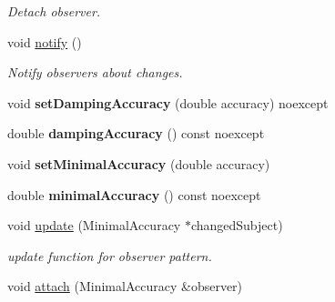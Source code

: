 \begin{DoxyCompactItemize}
\begin{DoxyCompactList}\small\item\em Detach observer. \end{DoxyCompactList}\item 
\hypertarget{classSpacy_1_1Mixin_1_1MixinConnection_a1ddeaa78a3bb4a38c2cca36d1f99fe36}{}void \hyperlink{classSpacy_1_1Mixin_1_1MixinConnection_a1ddeaa78a3bb4a38c2cca36d1f99fe36}{notify} ()\label{classSpacy_1_1Mixin_1_1MixinConnection_a1ddeaa78a3bb4a38c2cca36d1f99fe36}

\begin{DoxyCompactList}\small\item\em Notify observers about changes. \end{DoxyCompactList}\item 
\hypertarget{classSpacy_1_1Mixin_1_1DampingAccuracy_af934aaf17595b7029d9a8ecec2561599}{}void {\bfseries set\+Damping\+Accuracy} (double accuracy) noexcept\label{classSpacy_1_1Mixin_1_1DampingAccuracy_af934aaf17595b7029d9a8ecec2561599}

\item 
\hypertarget{classSpacy_1_1Mixin_1_1DampingAccuracy_a070c4c1b64c4392c6b21478bcf4c4a75}{}double {\bfseries damping\+Accuracy} () const noexcept\label{classSpacy_1_1Mixin_1_1DampingAccuracy_a070c4c1b64c4392c6b21478bcf4c4a75}

\item 
\hypertarget{classSpacy_1_1Mixin_1_1MinimalAccuracy_a34d3d3320bba45d5c6c06b65e2cc808b}{}void {\bfseries set\+Minimal\+Accuracy} (double accuracy)\label{classSpacy_1_1Mixin_1_1MinimalAccuracy_a34d3d3320bba45d5c6c06b65e2cc808b}

\item 
\hypertarget{classSpacy_1_1Mixin_1_1MinimalAccuracy_ab9e4346b7070ce179593fc38d556705b}{}double {\bfseries minimal\+Accuracy} () const noexcept\label{classSpacy_1_1Mixin_1_1MinimalAccuracy_ab9e4346b7070ce179593fc38d556705b}

\item 
\hypertarget{classSpacy_1_1Mixin_1_1MinimalAccuracy_a98dc7eb03f50165f6f2e0df17c2b7d44}{}void \hyperlink{classSpacy_1_1Mixin_1_1MinimalAccuracy_a98dc7eb03f50165f6f2e0df17c2b7d44}{update} (Minimal\+Accuracy $\ast$changed\+Subject)\label{classSpacy_1_1Mixin_1_1MinimalAccuracy_a98dc7eb03f50165f6f2e0df17c2b7d44}

\begin{DoxyCompactList}\small\item\em update function for observer pattern. \end{DoxyCompactList}\item 
\hypertarget{classSpacy_1_1Mixin_1_1MixinConnection_abb5520ee6b22dd993d78f142939a1ed4}{}void \hyperlink{classSpacy_1_1Mixin_1_1MixinConnection_abb5520ee6b22dd993d78f142939a1ed4}{attach} (Minimal\+Accuracy \&observer)\label{classSpacy_1_1Mixin_1_1MixinConnection_abb5520ee6b22dd993d78f142939a1ed4}


\end{DoxyCompactItemize}
